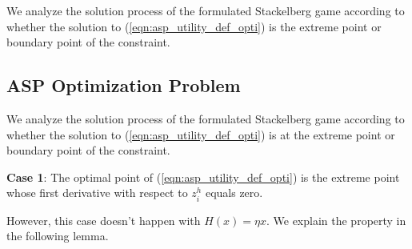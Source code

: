 \documentclass[conference]{IEEEtran}
\begin{document}
We analyze the solution process of the formulated Stackelberg game according to whether the solution to (\ref{eqn:asp_utility_def_opti}) is the extreme point or boundary point of the constraint.
\fi

\subsection{ASP Optimization Problem}
We analyze the solution process of the formulated Stackelberg game according to whether the solution to (\ref{eqn:asp_utility_def_opti}) is at the extreme point or boundary point of the constraint.

\textbf{Case 1}: The optimal point of (\ref{eqn:asp_utility_def_opti}) is the extreme point whose first derivative with respect to $z_i^h$ equals zero. 

However, this case doesn't happen with $H(x) = \eta{x}$. %
We explain the property in the following lemma.
\end{document}
